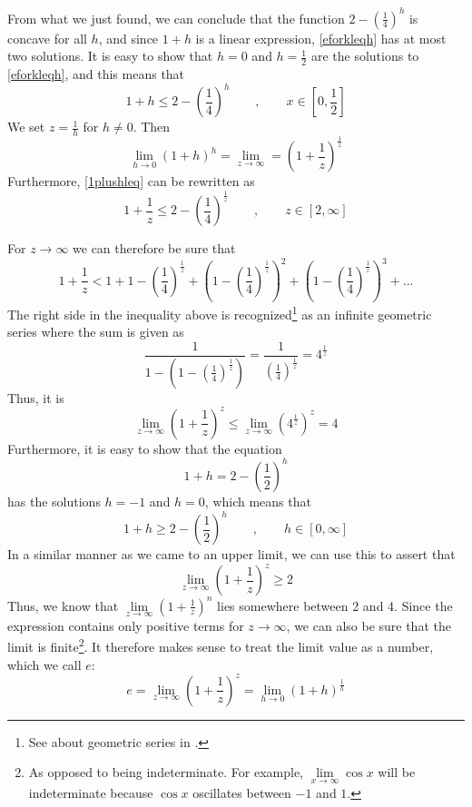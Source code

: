 \newpage
From what we just found, we can conclude that the function $2-\left(\frac{1}{4}\right)^h $ is concave for all $ h $, and since $ 1+h$ is a linear expression, \eqref{eforkleqh} has at most two solutions. It is easy to show that $ h=0 $ and $ h=\frac{1}{2} $ are the solutions to \eqref{eforkleqh}, and this means that
\begin{equation}\label{1plushleq}
	1+h\leq 2-\left(\frac{1}{4}\right)^h\qquad,\qquad x\in\left[0, \frac{1}{2}\right] 	
\end{equation}
We set $z=\frac{1}{h} $ for $ h\neq0 $. Then
\[ \lim\limits_{h\to 0} (1+h)^h=\lim\limits_{z\to\infty}=\left(1+\frac{1}{z}\right)^\frac{1}{z} \]
Furthermore, \eqref{1plushleq} can be rewritten as
\begin{equation}\label{eforkleqz}
	1+\frac{1}{z}\leq 2-\left(\frac{1}{4}\right)^\frac{1}{z}\qquad,\qquad z\in[2, \infty]
\end{equation}

For $ z\to\infty $ we can therefore be sure that
\[ 1+\frac{1}{z}<1+1-\left(\frac{1}{4}\right)^\frac{1}{z}+\left(1-\left(\frac{1}{4}\right)^\frac{1}{z}\right)^2+\left(1-\left(\frac{1}{4}\right)^\frac{1}{z}\right)^3+... \]
The right side in the inequality above is recognized\footnote{See about geometric series in \tmto.} as an infinite geometric series where the sum is given as
\[ \frac{1}{1-\left(1-\left(\frac{1}{4}\right)^\frac{1}{z}\right)} =\frac{1}{\left(\frac{1}{4}\right)^\frac{1}{z}}=4^\frac{1}{z} \]
Thus, it is
\begin{equation}\label{eforkllim4}
	\lim\limits_{z\to\infty}\left(1+\frac{1}{z}\right)^z\leq \lim\limits_{z\to\infty}\left(4^\frac{1}{z}\right)^z=4
\end{equation}
\newpage
Furthermore, it is easy to show that the equation
\[ 1+h=2-\left(\frac{1}{2}\right)^h \]
has the solutions $ h=-1 $ and $ h=0 $, which means that
\[ 1+h\geq2-\left(\frac{1}{2}\right)^h \qquad,\qquad h\in[0, \infty]\]
In a similar manner as we came to an upper limit, we can use this to assert that
\[ \lim\limits_{z\to \infty}\left(1 + \frac{1}{z}\right)^z\geq 2 \] 
Thus, we know that $ \lim\limits_{z\to\infty }\left(1+\frac{1}{z}\right)^n $ lies somewhere between 2 and 4. Since the\\ expression contains only positive terms for $ {z\to\infty} $, we can also be sure that the limit is finite\footnote{As opposed to being indeterminate. For example, $ \lim\limits_{x\to \infty} \cos x $  will be indeterminate because $ \cos x $ oscillates between $ -1 $ and $ 1 $.}. It therefore makes sense to treat the limit value as a number, which we call $ e $:
\[ e=\lim\limits_{z\to\infty }\left(1+\frac{1}{z}\right)^z=\lim\limits_{h\to0}\left(1+h\right)^{\frac{1}{h}}  \]

